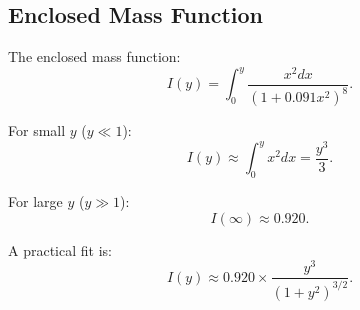 \documentclass[11pt,a4paper]{article}
\theoremstyle{definition}
\theoremstyle{remark}
\begin{document}
\subsection{Enclosed Mass Function}

The enclosed mass function:
\begin{equation}
I(y) = \int_0^y \frac{x^2 dx}{(1 + 0.091 x^2)^8}.
\end{equation}

For small $y$ ($y \ll 1$):
\begin{equation}
I(y) \approx \int_0^y x^2 dx = \frac{y^3}{3}.
\end{equation}

For large $y$ ($y \gg 1$):
\begin{equation}
I(\infty) \approx 0.920.
\end{equation}

A practical fit is:
\begin{equation}
I(y) \approx 0.920 \times \frac{y^3}{(1 + y^2)^{3/2}}.
\end{equation}

\end{document}
